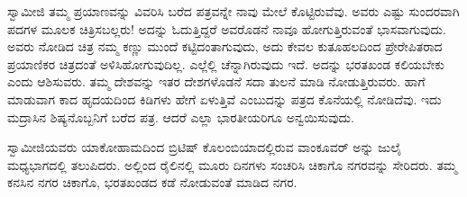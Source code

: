  ಸ್ವಾಮೀಜಿ ತಮ್ಮ ಪ್ರಯಾಣವನ್ನು ವಿವರಿಸಿ ಬರೆದ ಪತ್ರವನ್ನೇ ನಾವು ಮೇಲೆ ಕೊಟ್ಟಿರುವೆವು. ಅವರು ಎಷ್ಟು ಸುಂದರವಾಗಿ ಪದಗಳ ಮೂಲಕ ಚಿತ್ರಿಸಬಲ್ಲರು! ಅದನ್ನು ಓದುತ್ತಿದ್ದರೆ ಅವರೊಡನೆ ನಾವೂ ಹೋಗುತ್ತಿರುವಂತೆ ಭಾಸವಾಗುವುದು. ಅವರು ನೋಡಿದ ಚಿತ್ರ ನಮ್ಮ ಕಣ್ಣು ಮುಂದೆ ಕಟ್ಟಿದಂತಾಗುವುದು, ಅದು ಕೇವಲ ಕುತೂಹಲದಿಂದ ಪ್ರೇರೇಪಿತರಾದ ಪ್ರಯಾಣಿಕರ ಚಿತ್ರದಂತೆ ಅಳಿಸಿಹೋಗುವುದಿಲ್ಲ. ಎಲ್ಲೆಲ್ಲಿ ಚೆನ್ನಾಗಿರುವುದು ಇದೆ. ಅದನ್ನು ಭರತಖಂಡ ಕಲಿಯಬೇಕು ಎಂದು ಆಶಿಸುವರು. ತಮ್ಮ ದೇಶವನ್ನು ಇತರ ದೇಶಗಳೊಡನೆ ಸದಾ ತುಲನೆ ಮಾಡಿ ನೋಡುತ್ತಿರುವರು. ಹಾಗೆ ಮಾಡುವಾಗ ಕಾದ ಹೃದಯದಿಂದ ಕಿಡಿಗಳು ಹೇಗೆ ಏಳುತ್ತಿವೆ ಎಂಬುದನ್ನು ಪತ್ರದ ಕೊನೆಯಲ್ಲಿ ನೋಡಿದೆವು. ಇದು ಮದ್ರಾಸಿನ ಶಿಷ್ಯನೊಬ್ಬನಿಗೆ ಬರೆದ ಪತ್ರ. ಆದರೆ ಎಲ್ಲಾ ಭಾರತೀಯರಿಗೂ ಅನ್ವಯಿಸುವುದು. 

 ಸ್ವಾಮೀಜಿಯವರು ಯಾಕೋಹಾಮದಿಂದ ಬ್ರಿಟಿಷ್ ಕೊಲಂಬಿಯಾದಲ್ಲಿರುವ ವಾಂಕೂವರ್ ಅನ್ನು ಜುಲೈ ಮಧ್ಯಭಾಗದಲ್ಲಿ ತಲುಪಿದರು. ಅಲ್ಲಿಂದ ರೈಲಿನಲ್ಲಿ ಮೂರು ದಿನಗಳು ಸಂಚರಿಸಿ ಚಿಕಾಗೊ ನಗರವನ್ನು ಸೇರಿದರು. ತಮ್ಮ ಕನಸಿನ ನಗರ ಚಿಕಾಗೊ, ಭರತಖಂಡದ ಕಡೆ ನೋಡುವಂತೆ ಮಾಡಿದ ನಗರ. 

